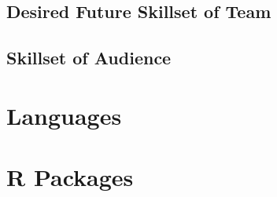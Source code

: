 \documentclass[
]{book}
\begin{document}
\hypertarget{desired-future-skillset-of-team}{%
\subsection{Desired Future Skillset of Team}\label{desired-future-skillset-of-team}}

\hypertarget{skillset-of-audience}{%
\subsection{Skillset of Audience}\label{skillset-of-audience}}

\hypertarget{languages}{%
\section{Languages}\label{languages}}

\hypertarget{r-packages}{%
\section{R Packages}\label{r-packages}}
\end{document}
